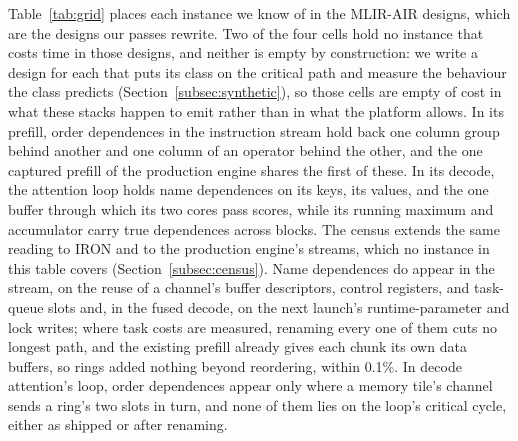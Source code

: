 Table~\ref{tab:grid} places each instance we know of in the MLIR-AIR designs, which are the designs our passes rewrite.
Two of the four cells hold no instance that costs time in those designs, and neither is empty by construction: we write a design for each that puts its class on the critical path and measure the behaviour the class predicts (Section~\ref{subsec:synthetic}), so those cells are empty of cost in what these stacks happen to emit rather than in what the platform allows.
In its prefill, order dependences in the instruction stream hold back one column group behind another and one column of an operator behind the other, and the one captured prefill of the production engine shares the first of these.
In its decode, the attention loop holds name dependences on its keys, its values, and the one buffer through which its two cores pass scores, while its running maximum and accumulator carry true dependences across blocks.
The census extends the same reading to IRON and to the production engine's streams, which no instance in this table covers (Section~\ref{subsec:census}).
Name dependences do appear in the stream, on the reuse of a channel's buffer descriptors, control registers, and task-queue slots and, in the fused decode, on the next launch's runtime-parameter and lock writes; where task costs are measured, renaming every one of them cuts no longest path, and the existing prefill already gives each chunk its own data buffers, so rings added nothing beyond reordering, within 0.1\%.
In decode attention's loop, order dependences appear only where a memory tile's channel sends a ring's two slots in turn, and none of them lies on the loop's critical cycle, either as shipped or after renaming.
